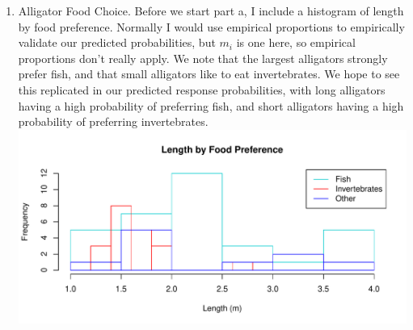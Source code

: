 \documentclass[12pt]{article}
\begin{document}
\begin{enumerate}
\begin{enumerate}[(a)]
\end{enumerate}

\item Alligator Food Choice. Before we start part a, I include a histogram of length by food preference. Normally I would use empirical proportions to empirically validate our predicted probabilities, but $m_i$ is one here, so empirical proportions don't really apply. We note that the largest alligators strongly prefer fish, and that small alligators like to eat invertebrates. We hope to see this replicated in our predicted response probabilities, with long alligators having a high probability of preferring fish, and short alligators having a high probability of preferring invertebrates.\\
\newline
\includegraphics[scale = .7]{plot1.pdf} 




\end{enumerate}
\end{document}
